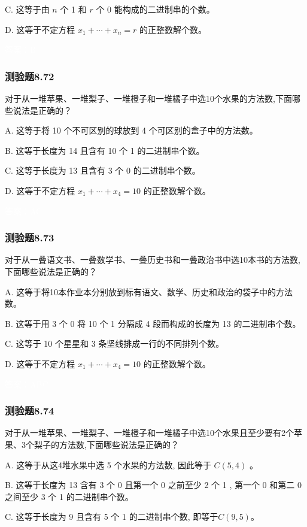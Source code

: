 \documentclass[UTF8, heading=true]{ctexart}
\begin{document}
C. 这等于由 $n$ 个 1 和 $r$ 个 0 能构成的二进制串的个数。

D. 这等于不定方程 $x_1+\cdots+x_n=r$ 的正整数解个数。

\textcolor{white}{答案：B}

\subsubsection{测验题8.72}

对于从一堆苹果、一堆梨子、一堆橙子和一堆橘子中选10个水果的方法数,下面哪些说法是正确的？

A. 这等于将 10 个不可区别的球放到 4 个可区别的盒子中的方法数。

B. 这等于长度为 14 且含有 10 个 1 的二进制串个数。

C. 这等于长度为 13 且含有 3 个 0 的二进制串个数。

D. 这等于不定方程 $x_1+\cdots+x_4=10$ 的正整数解个数。

\textcolor{white}{答案：AC}

\subsubsection{测验题8.73}

对于从一叠语文书、一叠数学书、一叠历史书和一叠政治书中选10本书的方法数,下面哪些说法是正确的？

A. 这等于将10本作业本分别放到标有语文、数学、历史和政治的袋子中的方法数。

B. 这等于用 3 个 0 将 10 个 1 分隔成 4 段而构成的长度为 13 的二进制串个数。

C. 这等于 10 个星星和 3 条坚线排成一行的不同排列个数。

D. 这等于不定方程 $x_1+\cdots+x_4=10$ 的正整数解个数。

\textcolor{white}{答案：ABC}

\subsubsection{测验题8.74}

对于从一堆苹果、一堆梨子、一堆橙子和一堆橘子中选10个水果且至少要有2个苹果、3个梨子的方法数,下面哪些说法是正确的？

A. 这等于从这4堆水果中选 5 个水果的方法数, 因此等于 $C(5,4)$ 。

B. 这等于长度为 13 含有 3 个 0 且第一个 0 之前至少 2 个 1 , 第一个 0 和第二 0 之间至少 3 个 1 的二进制串个数。

C. 这等于长度为 9 且含有 5 个 1 的二进制串个数, 即等于$C(9,5)$。
\end{document}
